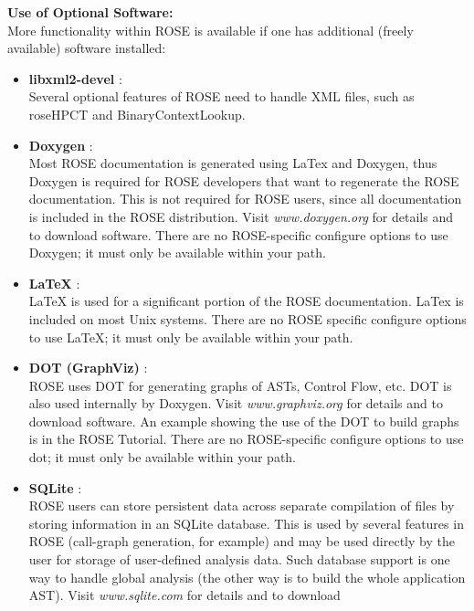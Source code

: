 {\bf Use of Optional Software:} \\
More functionality within ROSE is available if one has additional (freely available) software installed:
\begin{itemize}
   \item {\bf libxml2-devel }: \\
         Several optional features of ROSE need to handle XML files, such as
         roseHPCT and BinaryContextLookup.
   \item {\bf Doxygen} : \\
          Most ROSE documentation is generated using LaTex and Doxygen, thus
          Doxygen is required for ROSE developers that want to regenerate the ROSE
          documentation. This is not required for ROSE users, since all documentation is 
          included in the ROSE distribution. Visit {\it www.doxygen.org} for details and to
          download software.  There are no ROSE-specific configure options to use Doxygen;
          it must only be available within your path.
   \item {\bf LaTeX} : \\
          LaTeX is used for a significant portion of the ROSE documentation. LaTex is 
          included on most Unix systems. There are no ROSE specific configure options 
          to use LaTeX; it must only be available within your path.
   \item {\bf DOT (GraphViz)} : \\
          ROSE uses DOT for generating graphs of ASTs, Control Flow, etc.
          DOT is also used internally by Doxygen.
          Visit {\it www.graphviz.org} for details and to download software.
          An example showing the use of the DOT to build graphs is in the ROSE Tutorial.
          There are no ROSE-specific configure options to use dot; it must only be 
          available within your path.
   \item {\bf SQLite} : \\
          ROSE users can store persistent data across separate compilation of files by
          storing information in an SQLite database.  This is used by several features
          in ROSE (call-graph generation, for example) and may be used directly by the
          user for storage of user-defined analysis data.  Such database support is
          one way to handle global analysis (the other way is to build the whole
          application AST). Visit {\it www.sqlite.com} for details and to download

\end{itemize}
